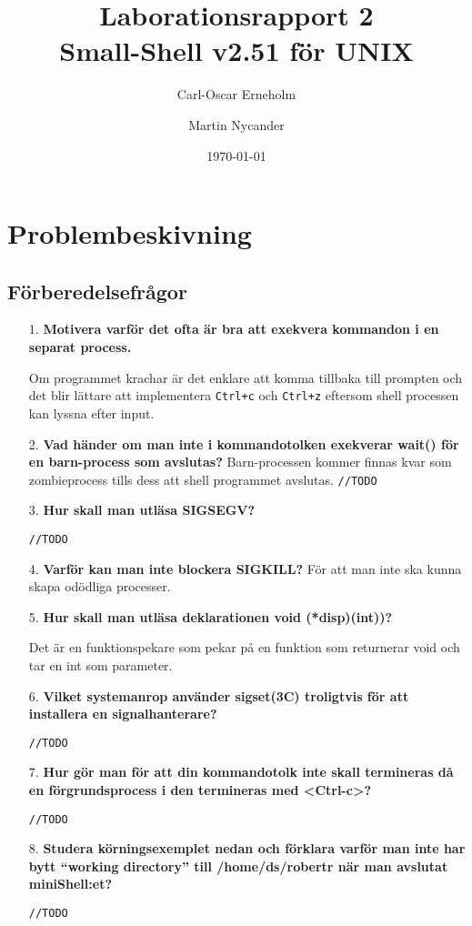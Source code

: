 \documentclass[a4paper,10pt,titlepage]{article}
\title{Laborationsrapport 2 \\ Small-Shell v2.51 för UNIX}
\author{Carl-Oscar Erneholm \and Martin Nycander}
\date{\today}
\begin{document}


\maketitle

\tableofcontents
\thispagestyle{empty}
\newpage
\setcounter{page}{1}
\section{Problembeskivning}

\subsection{Förberedelsefrågor}


\begin{enumerate}
	\item[1.] \textbf{\footnotesize Motivera varför det ofta är bra att exekvera kommandon i en separat process.}

	Om programmet krachar är det enklare att komma tillbaka till prompten och
    det blir lättare att implementera \verb!Ctrl+c! och \verb!Ctrl+z! eftersom
    shell processen kan lyssna efter input.

	\item[2.] \textbf{\footnotesize Vad händer om man inte i kommandotolken exekverar wait() för en barn-process som avslutas?}
	Barn-processen kommer finnas kvar som zombieprocess tills dess att shell
    programmet avslutas.
	\verb!//TODO!


	\item[3.] \textbf{\footnotesize Hur skall man utläsa SIGSEGV?}
	
	\verb!//TODO!


	\item[4.] \textbf{\footnotesize Varför kan man inte blockera SIGKILL?}
    För att man inte ska kunna skapa odödliga processer.


	\item[5.] \textbf{\footnotesize Hur skall man utläsa deklarationen void (*disp)(int))?}
	
    Det är en funktionspekare som pekar på en funktion som returnerar void och
    tar en int som parameter.


	\item[6.] \textbf{\footnotesize Vilket systemanrop använder sigset(3C) troligtvis för att installera en signalhanterare?}
	
	\verb!//TODO!


	\item[7.] \textbf{\footnotesize Hur gör man för att din kommandotolk inte skall termineras då en förgrundsprocess i den termineras med <Ctrl-c>?}
	
	\verb!//TODO!


	\item[8.] \textbf{\footnotesize Studera körningsexemplet nedan och förklara varför man inte har bytt “working directory” till /home/ds/robertr när man avslutat miniShell:et?}
	
	\verb!//TODO!

\end{enumerate}
\end{document}
